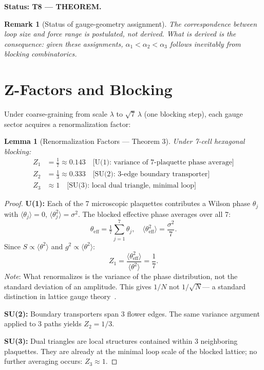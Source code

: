 \documentclass[11pt,letterpaper]{article}
\newtheorem{lemma}[theorem]{Lemma}
\newtheorem{remark}[theorem]{Remark}
\begin{document}
\textbf{Status: T8 --- THEOREM.}

\begin{remark}[Status of gauge-geometry assignment]
The correspondence between loop size and force range is postulated, not
derived.  What \emph{is} derived is the consequence: given these assignments,
$\alpha_1 < \alpha_2 < \alpha_3$ follows inevitably from blocking
combinatorics.
\end{remark}

\section{Z-Factors and Blocking}\label{sec:zfactors}

Under coarse-graining from scale $\lambda$ to $\sqrt{7}\,\lambda$ (one
blocking step), each gauge sector acquires a renormalization factor:

\begin{lemma}[Renormalization Factors --- Theorem 3]\label{thm:T3}
Under 7-cell hexagonal blocking:
\begin{align}
  Z_1 &= \tfrac{1}{7} \approx 0.143 \quad \text{[U(1): variance of 7-plaquette phase average]} \\
  Z_2 &= \tfrac{1}{3} \approx 0.333 \quad \text{[SU(2): 3-edge boundary transporter]} \\
  Z_3 &\approx 1                \quad \text{[SU(3): local dual triangle, minimal loop]}
\end{align}
\end{lemma}

\begin{proof}
\textbf{U(1):} Each of the 7 microscopic plaquettes contributes a Wilson
phase $\theta_j$ with $\langle\theta_j\rangle=0$, $\langle\theta_j^2\rangle=\sigma^2$.
The blocked effective phase averages over all 7:
\begin{equation}
  \theta_\mathrm{eff} = \tfrac{1}{7}\sum_{j=1}^{7}\theta_j,
  \quad
  \langle\theta_\mathrm{eff}^2\rangle = \frac{\sigma^2}{7}.
\end{equation}
Since $S\propto\langle\theta^2\rangle$ and $g^2\propto\langle\theta^2\rangle$:
\begin{equation}
  Z_1 = \frac{\langle\theta_\mathrm{eff}^2\rangle}{\langle\theta^2\rangle} = \frac{1}{7}.
\end{equation}
\emph{Note}: What renormalizes is the variance of the phase distribution, not
the standard deviation of an amplitude.  This gives $1/N$ not $1/\sqrt{N}$---
a standard distinction in lattice gauge theory~\cite{Creutz1983}.

\textbf{SU(2):} Boundary transporters span 3 flower edges.  The same variance
argument applied to 3 paths yields $Z_2 = 1/3$.

\textbf{SU(3):} Dual triangles are local structures contained within 3
neighboring plaquettes.  They are already at the minimal loop scale of the
blocked lattice; no further averaging occurs: $Z_3\approx1$.
\end{proof}
\end{document}
